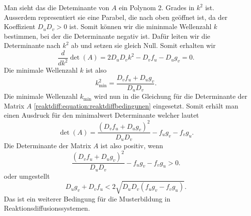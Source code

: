 Man sieht das die Deteminante von \(A\) ein Polynom 2. Grades in \(k^2\) ist.
Ausserdem representiert sie eine Parabel, die nach oben geöffnet ist, da der Koeffizient \(D_uD_v > 0\) ist.
Somit können wir die mininmale Wellenzahl \(k\) bestimmen, bei der die Determinante negativ ist.
Dafür leiten wir die Determinante nach \(k^2\) ab und setzen sie gleich Null.
Somit erhalten wir
\begin{equation*}
    \frac{d}{dk^2} \det(A) = 2D_uD_vk^2 - D_v f_u - D_u g_v = 0.
\end{equation*}
Die minimale Wellenzahl \(k\) ist also
\begin{equation*}
    k^2_{\text{min}} = \frac{D_vf_u + D_ug_v}{D_uD_v}.
\end{equation*}
Die minimale Wellenzahl \(k_{\text{min}}\) wird nun in die Gleichung für die Determinante der Matrix \(A\) \ref{reaktdiff:equation:reaktdiffbedingunen} eingesetzt.
Somit erhält man einen Ausdruck für den minimalwert Determinante welcher lautet
\begin{equation*}
    \det(A) = \frac{(D_vf_u + D_ug_v)^2}{D_uD_v} - f_u g_v - f_v g_u.
\end{equation*}
Die Determinante der Matrix \(A\) ist also positiv, wenn
\begin{equation*}
    \frac{(D_vf_u + D_ug_v)^2}{D_uD_v} - f_u g_v - f_v g_u > 0.
\end{equation*}
oder umgestellt
\begin{equation*}
    D_ug_v+D_vf_u < 2\sqrt{D_uD_v(f_u g_v - f_v g_u)}.
\end{equation*}
Das ist ein weiterer Bedingung für die Musterbildung in Reaktionsdiffusionssystemen.








